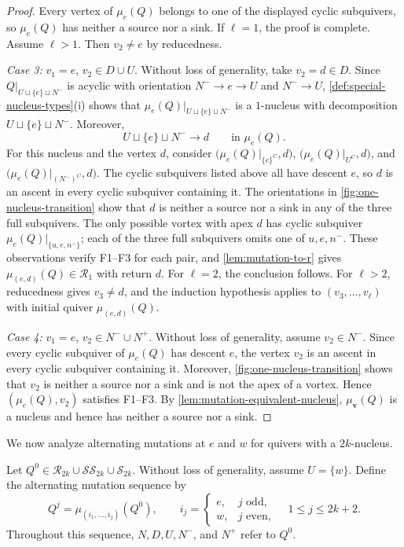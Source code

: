 \documentclass[10pt,a4paper]{amsart}
\theoremstyle{definition}
\theoremstyle{definition}
\numberwithin{equation}{section}
\numberwithin{table}{section}
\newcommand{\nminus}{N^{-}}
\newcommand{\nplus}{N^{+}}
\newcommand{\Rclass}{\mathcal{R}}
\newcommand{\SSclass}{\mathcal{SS}}
\newcommand{\Sclass}{\mathcal{S}}
\newcommand{\Qalt}[1]{Q^{#1}}
\begin{document}
\begin{proof}
Every vertex of $\mu_e(Q)$ belongs to one of the displayed cyclic subquivers,
so $\mu_e(Q)$ has neither a source nor a sink. If $\ell=1$, the proof is
complete. Assume $\ell>1$. Then $v_2\ne e$ by reducedness.

\emph{Case 3:} $v_1=e$, $v_2\in D\cup U$.
Without loss of generality, take $v_2=d\in D$.
Since $Q|_{U\sqcup\{e\}\sqcup\nminus}$ is acyclic with orientation
$\nminus\to e\to U$ and $\nminus\to U$,
\cref{def:special-nucleus-types}\textup{(i)} shows that
$\mu_e(Q)|_{U\sqcup\{e\}\sqcup\nminus}$ is a $1$-nucleus with decomposition
$U\sqcup\{e\}\sqcup\nminus$.
Moreover,
\[
 U\sqcup\{e\}\sqcup\nminus\longrightarrow d
 \qquad\text{in }\mu_e(Q).
\]
For this nucleus and the vertex $d$, consider
$\bigl(\mu_e(Q)|_{\{e\}^C},d\bigr)$,
$\bigl(\mu_e(Q)|_{U^C},d\bigr)$, and
$\bigl(\mu_e(Q)|_{(\nminus)^C},d\bigr)$.
The cyclic subquivers listed above all have descent $e$, so $d$ is an ascent
in every cyclic subquiver containing it. The orientations in
\cref{fig:one-nucleus-transition} show that $d$ is neither a source nor a sink
in any of the three full subquivers. The only possible vortex with apex $d$
has cyclic subquiver
$\mu_e(Q)|_{\{u,e,n^-\}}$; each of the three full subquivers omits one of
$u,e,n^-$. These observations verify F1--F3 for each pair, and
\cref{lem:mutation-to-r} gives $\mu_{(e,d)}(Q)\in\Rclass_1$ with return $d$.
For $\ell=2$, the conclusion follows. For $\ell>2$, reducedness gives
$v_3\ne d$, and the induction hypothesis applies to $(v_3,\ldots,v_\ell)$
with initial quiver $\mu_{(e,d)}(Q)$.

\emph{Case 4:} $v_1=e$, $v_2\in\nminus\cup\nplus$.
Without loss of generality, assume $v_2\in\nminus$. Since every cyclic
subquiver of $\mu_e(Q)$ has descent $e$,
the vertex $v_2$ is an ascent in every cyclic subquiver containing it.
Moreover, \cref{fig:one-nucleus-transition} shows that $v_2$ is neither a
source nor a sink and is not the apex of a vortex. Hence
$(\mu_e(Q),v_2)$ satisfies F1--F3. By
\cref{lem:mutation-equivalent-nucleus}, $\mu_{\mathbf v}(Q)$ is a nucleus
and hence has neither a source nor a sink.
\end{proof}

We now analyze alternating mutations at $e$ and $w$ for quivers with a
$2k$-nucleus.

Let $\Qalt{0}\in\Rclass_{2k}\cup\SSclass_{2k}\cup\Sclass_{2k}$.
Without loss of generality, assume $U=\{w\}$. Define the alternating mutation sequence by
\begin{equation}\label{eq:alternating-sequence}
\Qalt{j}=\mu_{(i_1,\ldots,i_j)}(\Qalt{0}),\qquad
i_j=\begin{cases}
e,&j\text{ odd},\\
w,&j\text{ even},
\end{cases}
\quad 1\le j\le2k+2.
\end{equation}
Throughout this sequence, $N,D,U,\nminus$, and $\nplus$ refer to $\Qalt{0}$.
\end{document}
